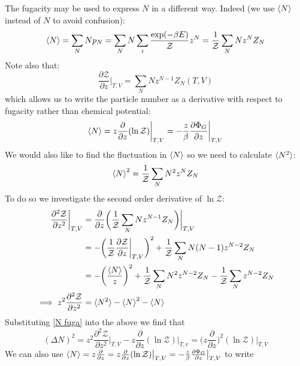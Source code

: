 \documentclass[a4paper,11pt,oneside]{book}
\begin{document}
The fugacity may be used to express $N$ in a different way. Indeed (we use $\braket{N}$ instead of $N$ to avoid confusion):
\begin{equation}
    \braket{N} = \sum_N N p_N = \sum_N N \sum_i \frac{\exp(-\beta E)}{\mathcal{Z}} z^N = \frac{1}{\mathcal{Z}} \sum_N N z^N Z_N
\end{equation}
Note also that:
\begin{equation}
    \frac{\partial \mathcal{Z}}{\partial z}\bigg|_{T,V} = \sum_N N z^{N-1}Z_N(T,V)
\end{equation}
which allows us to write the particle number as a derivative with respect to fugacity rather than chemical potential:
\begin{equation}\label{N fuga}
    \braket{N} = z\frac{\partial}{\partial z}(\ln \mathcal{Z})\bigg|_{T,V} = -\frac{z}{\beta} \frac{\partial \Phi_G}{\partial z}\bigg|_{T,V}
\end{equation}
We would also like to find the fluctuation in $\braket{N}$ so we need to calculate $\braket{N^2}$:
\begin{equation}
    \braket{N}^2 = \frac{1}{\mathcal{Z}} \sum_N N^2 z^N Z_N
\end{equation}
To do so we investigate the second order derivative of $\ln \mathcal{Z}$:
\begin{align}
        \frac{\partial^2 \mathcal{Z}}{\partial z^2}\bigg|_{T,V} &= \frac{\partial}{\partial z}\bigg(\frac{1}{\mathcal{Z}} \sum_N N z^{N-1}Z_N\bigg)\bigg|_{T,V}\\
        &=-\bigg(\frac{1}{\mathcal{Z}} \frac{\partial \mathcal{Z}}{\partial z}\bigg|_{T,V}\bigg)^2+\frac{1}{\mathcal{Z}} \sum_N N(N-1) z^{N-2} Z_N\\
        &=-\bigg(\frac{\braket{N}}{z}\bigg)^2+\frac{1}{\mathcal{Z}} \sum_N N^2 z^{N-2} Z_N-\frac{1}{\mathcal{Z}} \sum_N z^{N-2} Z_N\\
        \implies z^2  \frac{\partial^2 \mathcal{Z}}{\partial z^2}  &= \braket{N^2}-\braket{N}^2-\braket{N}
\end{align}
Substituting \eqref{N fuga} into the above we find that
\begin{equation}
    (\Delta N)^2= z^2  \frac{\partial^2 \mathcal{Z}}{\partial z^2}\bigg|_{T,V}  -  z\frac{\partial}{\partial z}(\ln \mathcal{Z})\bigg|_{T,v} = \bigg(z\frac{\partial}{\partial z}\bigg)^2(\ln \mathcal{Z})\bigg|_{T,V}
\end{equation}
We can also use $\braket{N} = z\frac{\partial}{\partial z} =  z\frac{\partial}{\partial z}(\ln \mathcal{Z})\big|_{T,V} = -\frac{z}{\beta} \frac{\partial \Phi_G}{\partial z}\big|_{T,V}$ to write
\end{document}
